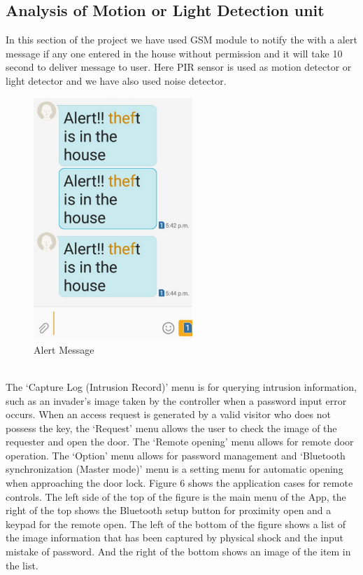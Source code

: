 \documentclass[twoside,a4paper,16pt]{book}
\begin{document}
{{\subsection{Analysis of Motion or Light Detection unit}
   In this section of the project we have used GSM module to notify the with a alert message if any one entered in the house without permission and it will take 10 second to deliver message to user. Here PIR sensor is used as motion detector or light detector and we have also used noise detector. 
    \begin{figure}[ht!]
   	\begin{center}
   		\includegraphics[width=6.0cm]{p3.jpeg}
   		\caption{Alert Message}
   	\end{center}
   \end{figure}
\\
  The ‘Capture Log (Intrusion Record)’ menu is for querying intrusion information, such as an invader’s image taken by the controller when a password input error occurs. When an access request is generated by a valid visitor who does not possess the key, the ‘Request’ menu allows the user to check the image of the requester and open the door. The ‘Remote opening’ menu allows for remote door operation. The ‘Option’ menu allows for password management and ‘Bluetooth synchronization (Master mode)’ menu is a setting menu for automatic opening when approaching the door lock. Figure 6 shows the application cases for remote controls. The left side of the top of the figure is the main menu of the App, the right of the top shows the Bluetooth setup button for proximity open and a keypad for the remote open. The left of the bottom of the figure shows a list of the image information that has been captured by physical shock and the input mistake of password. And the right of the bottom shows an image of the item in the list.
}}
\end{document}
